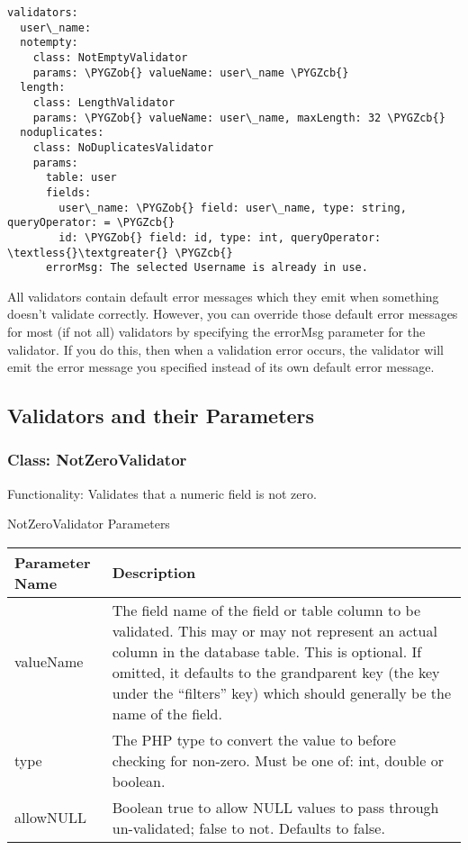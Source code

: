 \documentclass[letterpaper,10pt,english]{sphinxmanual}
\def\PYGZob{\char`\{}
\def\PYGZcb{\char`\}}
\begin{document}
\begin{Verbatim}[commandchars=\\\{\}]
validators:
  user\_name:
  notempty:
    class: NotEmptyValidator
    params: \PYGZob{} valueName: user\_name \PYGZcb{}
  length:
    class: LengthValidator
    params: \PYGZob{} valueName: user\_name, maxLength: 32 \PYGZcb{}
  noduplicates:
    class: NoDuplicatesValidator
    params:
      table: user
      fields:
        user\_name: \PYGZob{} field: user\_name, type: string, queryOperator: = \PYGZcb{}
        id: \PYGZob{} field: id, type: int, queryOperator: \textless{}\textgreater{} \PYGZcb{}
      errorMsg: The selected Username is already in use.
\end{Verbatim}

All validators contain default error messages which they emit when something doesn't validate
correctly.  However, you can override those default error messages for most (if not all) validators
by specifying the errorMsg parameter for the validator.  If you do this, then when a validation
error occurs, the validator will emit the error message you specified instead of its own default
error message.


\subsection{Validators and their Parameters}
\label{jaxFrameworkGuide:validators-and-their-parameters}

\subsubsection{Class: NotZeroValidator}
\label{jaxFrameworkGuide:class-notzerovalidator}
Functionality: Validates that a numeric field is not zero.

NotZeroValidator Parameters

\begin{tabulary}{\linewidth}{|L|L|}
\hline
\textbf{
Parameter Name
} & \textbf{
Description
}\\\hline

valueName
 & 
The field name of the field or table column to be validated.  This may or may not
represent an actual column in the database table.  This is optional.  If omitted, it
defaults to the grandparent key (the key under the ``filters'' key) which should
generally be the name of the field.
\\\hline

type
 & 
The PHP type to convert the value to before checking for non-zero.  Must be one of:
int, double or boolean.
\\\hline

allowNULL
 & 
Boolean true to allow NULL values to pass through un-validated; false to not.
Defaults to false.
\\\hline
\end{tabulary}
\end{document}
